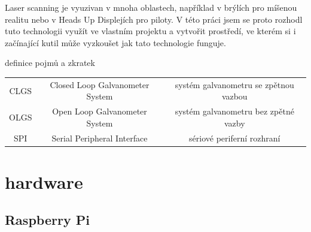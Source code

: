 \documentclass{template/socthesis}
\begin{document}
Laser scanning je vyuzivan v mnoha oblastech, například v brýlích pro míšenou realitu nebo v Heads Up Displejích pro piloty.
V této  práci jsem se proto rozhodl tuto technologii využít ve vlastním projektu a vytvořit prostředí, ve kterém si i začínající kutil může vyzkoušet jak tato technologie funguje.

\newpage

definice pojmů a zkratek
\begin{center}
  \begin{tabular}{c c c}
    CLGS & Closed Loop Galvanometer System & systém galvanometru se zpětnou vazbou \\
    OLGS & Open Loop Galvanometer System   & systém galvanometru bez zpětné vazby  \\
    SPI  & Serial Peripheral Interface     & sériové periferní rozhraní            \\
  \end{tabular}
\end{center}

\chapter{hardware}

\section{Raspberry Pi}
\end{document}
